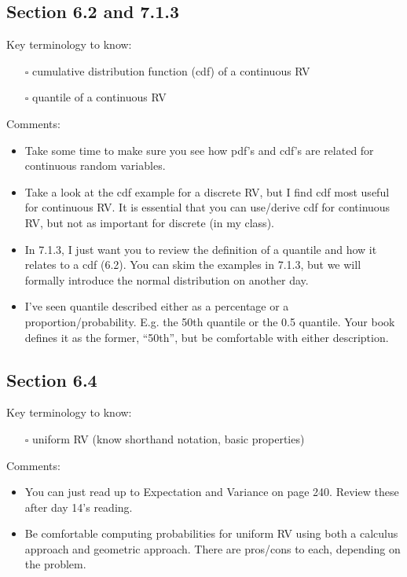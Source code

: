 \documentclass[
  letterpaper,
]{scrbook}
\providecommand{\tightlist}{%
  \setlength{\itemsep}{0pt}\setlength{\parskip}{0pt}}\usepackage{longtable,booktabs,array}
\begin{document}
\subsection*{Section 6.2 and 7.1.3}\label{section-6.2-and-7.1.3}

Key terminology to know:

\begin{itemize}
\tightlist
\item[$\square$]
  cumulative distribution function (cdf) of a continuous RV
\item[$\square$]
  quantile of a continuous RV
\end{itemize}

Comments:

\begin{itemize}
\tightlist
\item
  Take some time to make sure you see how pdf's and cdf's are related
  for continuous random variables.
\item
  Take a look at the cdf example for a discrete RV, but I find cdf most
  useful for continuous RV. It is essential that you can use/derive cdf
  for continuous RV, but not as important for discrete (in my class).
\item
  In 7.1.3, I just want you to review the definition of a quantile and
  how it relates to a cdf (6.2). You can skim the examples in 7.1.3, but
  we will formally introduce the normal distribution on another day.
\item
  I've seen quantile described either as a percentage or a
  proportion/probability. E.g. the 50th quantile or the 0.5 quantile.
  Your book defines it as the former, ``50th'', but be comfortable with
  either description.
\end{itemize}

\subsection*{Section 6.4}\label{section-6.4}

Key terminology to know:

\begin{itemize}
\tightlist
\item[$\square$]
  uniform RV (know shorthand notation, basic properties)
\end{itemize}

Comments:

\begin{itemize}
\tightlist
\item
  You can just read up to Expectation and Variance on page 240. Review
  these after day 14's reading.
\item
  Be comfortable computing probabilities for uniform RV using both a
  calculus approach and geometric approach. There are pros/cons to each,
  depending on the problem.
\end{itemize}
\end{document}
